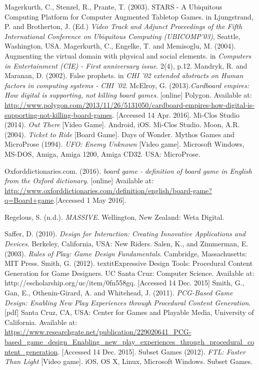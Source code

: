 \documentclass[a4paper,11pt]{article}
\begin{document}
\begin{thebibliography}{1}
Magerkurth, C., Stenzel, R., Prante, T. (2003). STARS - A Ubiquitous Computing Platform for Computer Augmented Tabletop Games. in Ljungstrand, P. and Brotherton, J. (Ed.) \textit{Video Track and Adjunct Proceedings of the Fifth
International Conference on Ubiquitous Computing (UBICOMP’03)}, Seattle, Washington, USA.
Magerkurth, C., Engelke, T. and Memisoglu, M. (2004). Augmenting the virtual domain with physical and social elements. in \textit{Computers in Entertainment (CIE) - First anniversary issue}. 2(4), p.12. 
Mandryk, R. and Maranan, D. (2002). False prophets. in \textit{CHI '02 extended abstracts on Human factors in computing systems - CHI '02}.
McElroy, G. (2013).\textit{Cardboard empires: How digital is supporting, not killing board games}. [online] Polygon. Available at: \url{http://www.polygon.com/2013/11/26/5131050/cardboard-empires-how-digital-is-supporting-not-killing-board-games}. [Accessed 14 Apr. 2016].
Mi-Clos Studio (2014). \textit{Out There} [Video Game]. Android, iOS. Mi-Clos Studio.
Moon, A.R. (2004). \textit{Ticket to Ride} [Board Game]. Days of Wonder.
Mythos Games and MicroProse (1994). \textit{UFO: Enemy Unknown} [Video game]. Microsoft Windows, MS-DOS, Amiga, Amiga 1200, Amiga CD32. USA: MicroProse.

Oxforddictionaries.com. (2016). \textit{board game - definition of board game in English from the Oxford dictionary}. [online] Available at:  \url{http://www.oxforddictionaries.com/definition/english/board-game?q=Board+game}.[Accessed 1 May 2016].

Regelous, S. (n.d.). \textit{MASSIVE}. Wellington, New Zealand: Weta Digital.

Saffer, D. (2010). \textit{Design for Interaction: Creating Innovative Applications and Devices}. Berkeley, California, USA: New Riders.
Salen, K., and Zimmerman, E. (2003). \textit{Rules of Play: Game Design Fundamentals}. Cambridge, Massachusetts: MIT Press.
Smith, G. (2012). textit{Expressive Design Tools: Procedural Content Generation for Game Designers}. UC Santa Cruz: Computer Science. Available at: http://escholarship.org/uc/item/0fn558gq. [Accessed 14 Dec. 2015]
Smith, G., Gan, E., Othenin-Girard, A. and Whitehead, J. (2011). \textit{PCG-Based Game Design: Enabling New Play Experiences through Procedural Content Generation}. [pdf] Santa Cruz, CA, USA: Center for Games and Playable Media, University of California. Available at: \url{https://www.researchgate.net/publication/229020641_PCG-based_game_design_Enabling_new_play_experiences_through_procedural_content_generation}. [Accessed 14 Dec. 2015].
Subset Games (2012). \textit{FTL: Faster Than Light} [Video game]. iOS, OS X, Linux, Microsoft Windows. Subset Games.



\end{thebibliography}
\end{document}
